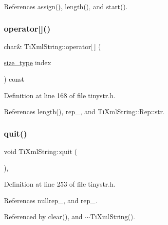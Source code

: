References assign(), length(), and start().

\hypertarget{class_ti_xml_string_a06e8c84831fc146610369405f4aa4200}{}\label{class_ti_xml_string_a06e8c84831fc146610369405f4aa4200} 
\subsubsection{\texorpdfstring{operator[]()}{operator[]()}}
{\footnotesize\ttfamily char\& Ti\+Xml\+String\+::operator\mbox{[}$\,$\mbox{]} (\begin{DoxyParamCaption}\item[{\hyperlink{class_ti_xml_string_abeb2c1893a04c17904f7c06546d0b971}{size\+\_\+type}}]{index }\end{DoxyParamCaption}) const\hspace{0.3cm}{\ttfamily [inline]}}



Definition at line 168 of file tinystr.\+h.



References length(), rep\+\_\+, and Ti\+Xml\+String\+::\+Rep\+::str.

\hypertarget{class_ti_xml_string_aa6008ae51286a342cd366fbf1e3eeafc}{}\label{class_ti_xml_string_aa6008ae51286a342cd366fbf1e3eeafc} 
\subsubsection{\texorpdfstring{quit()}{quit()}}
{\footnotesize\ttfamily void Ti\+Xml\+String\+::quit (\begin{DoxyParamCaption}{ }\end{DoxyParamCaption})\hspace{0.3cm}{\ttfamily [inline]}, {\ttfamily [private]}}



Definition at line 253 of file tinystr.\+h.



References nullrep\+\_\+, and rep\+\_\+.



Referenced by clear(), and $\sim$\+Ti\+Xml\+String().

\hypertarget{class_ti_xml_string_a88ecf9f0f00cb5c67b6b637958d7049c}{}\label{class_ti_xml_string_a88ecf9f0f00cb5c67b6b637958d7049c} 
